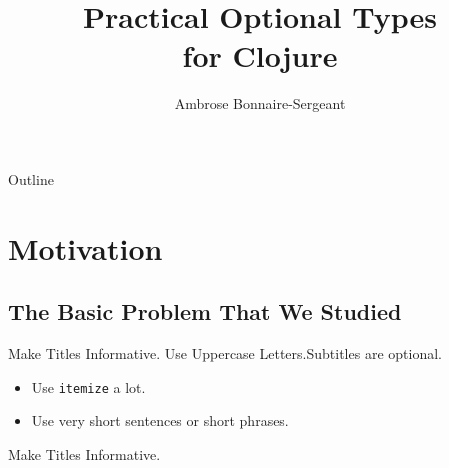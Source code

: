 \documentclass[aspectratio=169]{beamer}
\title%
{Practical Optional Types \\for Clojure}
\author%
{Ambrose Bonnaire-Sergeant%
}
\institute[Indiana University] %
{
  Department of Computer Science\\
  Indiana University
  }
\date%
{}
\begin{document}
{
\beamertemplatenavigationsymbolsempty

\begin{frame}
  \titlepage
\end{frame}

\begin{frame}{Outline}
  \tableofcontents[pausesections]
\end{frame}





\section{Motivation}

\subsection{The Basic Problem That We Studied}

\begin{frame}{Make Titles Informative. Use Uppercase Letters.}{Subtitles are optional.}

  \begin{itemize}
  \item
    Use \texttt{itemize} a lot.
  \item
    Use very short sentences or short phrases.
  \end{itemize}
\end{frame}

\begin{frame}{Make Titles Informative.}


\end{frame}}
\end{document}
